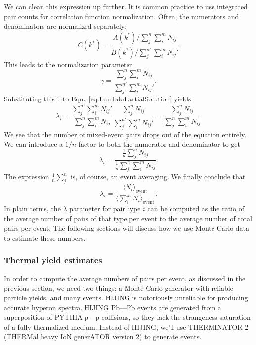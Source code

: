We can clean this expression up further.  It is common practice to use integrated pair counts for correlation function normalization. Often, the numerators and denominators are normalized separately:
\begin{equation}
C(k^*) = \frac{A(k^*)/\sum_j^n \sum_i^m N_{ij}}{B(k^*)/\sum_j^{n'} \sum_i^m N_{ij}'}
\end{equation}
This leads to the normalization parameter
\begin{equation}
\gamma = \frac{\sum_j^n \sum_i^m N_{ij}}{\sum_j^{n'} \sum_i^m N_{ij}'}.
\end{equation}
Substituting this into Eqn.\ \ref{eq:LambdaPartialSolution} yields 
\begin{equation}
\lambda_i = \frac{\sum_j^{n'} \sum_i^m N_{ij}'} {\sum_j^n \sum_i^m N_{ij}} \frac{\sum_j^n N_{ij} }{\sum_j^{n'} \sum_i^m N_{ij}'} = \frac{\sum_j^n N_{ij} }{\sum_j^n \sum_i^m N_{ij}}
\end{equation}
We see that the number of mixed-event pairs drops out of the equation entirely. We can introduce a $1/n$ factor to both the numerator and denominator to get
\begin{equation}
\lambda_i = \frac{\frac{1}{n}\sum_j^n N_{ij} }{\frac{1}{n}\sum_j^n \sum_i^m N_{ij}}.
\end{equation}
The expression $\frac{1}{n} \sum_j^n$ is, of course, an event averaging. We finally conclude that
\begin{equation}
\label{eq:LambdaParSolution}
\lambda_i = \frac{\langle N_{i}\rangle_{\mathrm{event}}} {\langle\sum_i^m N_{i}\rangle_{\mathrm{event}}}.
\end{equation}
In plain terms, the $\lambda$ parameter for pair type $i$ can be computed as the ratio of the average number of pairs of that type per event to the average number of total pairs per event. 
The following sections will discuss how we use Monte Carlo data to estimate these numbers.

\subsubsection{Thermal yield estimates}
\label{sec:ThermalYields}


In order to compute the average numbers of pairs per event, as discussed in the previous section, we need two things: a Monte Carlo generator with reliable particle yields, and many events. 
HIJING is notoriously unreliable for producing accurate hyperon spectra.  
HIJING Pb---Pb events are generated from a superposition of PYTHIA p---p collisions, so they lack the strangeness saturation of a fully thermalized medium.  
Instead of HIJING, we'll use THERMINATOR 2 (THERMal heavy IoN generATOR version 2)  \cite{Chojnacki:2011hb} to generate events.

